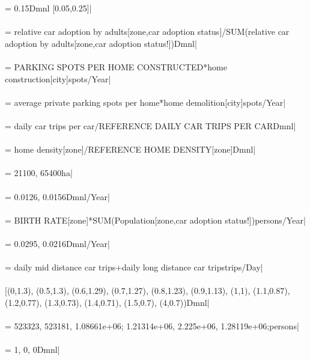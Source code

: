  = 0.15Dmnl [0.05,0.25]| \\ \\ 
 = relative car adoption by adults[zone,car adoption status]/SUM(relative car adoption by adults[zone,car adoption status!])Dmnl| \\ \\ 
 = PARKING SPOTS PER HOME CONSTRUCTED*home construction[city]spots/Year| \\ \\ 
 = average private parking spots per home*home demolition[city]spots/Year| \\ \\ 
 = daily car trips per car/REFERENCE DAILY CAR TRIPS PER CARDmnl| \\ \\ 
 = home density[zone]/REFERENCE HOME DENSITY[zone]Dmnl| \\ \\ 
 = 21100, 65400ha| \\ \\ 
 = 0.0126, 0.0156Dmnl/Year| \\ \\ 
 = BIRTH RATE[zone]*SUM(Population[zone,car adoption status!])persons/Year| \\ \\ 
 = 0.0295, 0.0216Dmnl/Year| \\ \\ 
 = daily mid distance car trips+daily long distance car tripstrips/Day| \\ \\ 
 [(0,1.3), (0.5,1.3), (0.6,1.29), (0.7,1.27), (0.8,1.23), (0.9,1.13), (1,1), (1.1,0.87), (1.2,0.77), (1.3,0.73), (1.4,0.71), (1.5,0.7), (4,0.7))Dmnl| \\ \\ 
 = 523323, 523181, 1.08661e+06; 1.21314e+06, 2.225e+06, 1.28119e+06;persons| \\ \\ 
 = 1, 0, 0Dmnl| \\ \\ 
